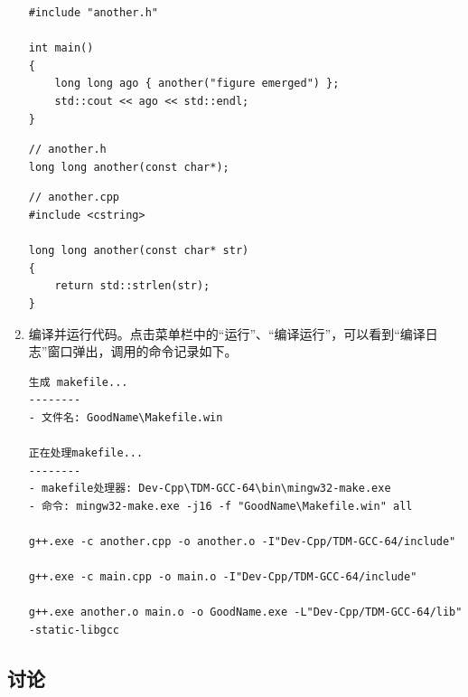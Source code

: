 \begin{enumerate}
\begin{lstlisting}[language={[17]C++}, moreemph={[2]another}]
#include "another.h"

int main()
{
	long long ago { another("figure emerged") };
	std::cout << ago << std::endl;
}
	\end{lstlisting}

	\begin{lstlisting}[language={[17]C++}, moreemph={[2]another}]
// another.h
long long another(const char*);
	\end{lstlisting}

	\begin{lstlisting}[language={[17]C++}, moreemph={[2]another, strlen}]
// another.cpp
#include <cstring>

long long another(const char* str)
{
	return std::strlen(str);
}
	\end{lstlisting}

	\item 编译并运行代码。点击菜单栏中的“运行”、“编译运行”，可以看到“编译日志”窗口弹出，调用的命令记录如下。

	\begin{lstlisting}[language={}]
生成 makefile...
--------
- 文件名: GoodName\Makefile.win

正在处理makefile...
--------
- makefile处理器: Dev-Cpp\TDM-GCC-64\bin\mingw32-make.exe
- 命令: mingw32-make.exe -j16 -f "GoodName\Makefile.win" all

g++.exe -c another.cpp -o another.o -I"Dev-Cpp/TDM-GCC-64/include"

g++.exe -c main.cpp -o main.o -I"Dev-Cpp/TDM-GCC-64/include"

g++.exe another.o main.o -o GoodName.exe -L"Dev-Cpp/TDM-GCC-64/lib" -static-libgcc
	\end{lstlisting}
\end{enumerate}

\subsection*{讨论}

